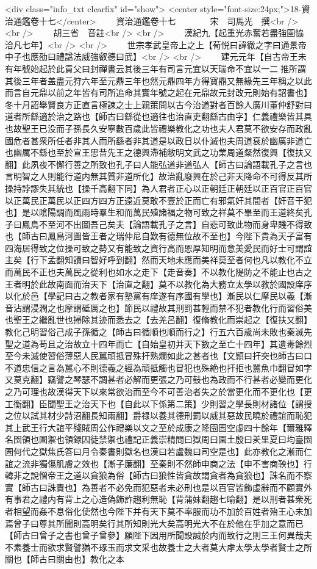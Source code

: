 <div class="info_txt clearfix" id="show">
<center style="font-size:24px;">18-資治通鑑卷十七</center>
  　　資治通鑑卷十七　　　　宋　司馬光　撰<br />
<br />
　　胡三省　音註<br />
<br />
　　漢紀九【起重光赤奮若盡強圉恊洽凡七年】<br />
<br />
　　世宗孝武皇帝上之上【荀悦曰諱徹之字曰通景帝中子也應劭曰禮諡法威強叡德曰武】<br />
<br />
　　建元元年【自古帝王未有年號始起於此貢父曰封禪書云其後三年有司言元宜以天瑞命不宜以一二推所謂其後三年者盖盡元狩六年至元鼎三年也然元鼎四年方得寶鼎又無緣先三年稱之以此而言自元鼎以前之年皆有司所追命其實年號之起在元鼎故元封改元則始有詔書也】冬十月詔舉賢良方正直言極諫之士上親策問以古今治道對者百餘人廣川董仲舒對曰道者所繇適於治之路也【師古曰繇從也適往也治直吏翻繇古由字】仁義禮樂皆其具也故聖王已没而子孫長久安寧數百歲此皆禮樂教化之功也夫人君莫不欲安存而政亂國危者甚衆所任者非其人而所繇者非其道是以政日以仆滅也夫周道衰於幽厲非道亡也幽厲不繇也至於宣王思昔先王之德興滯補敝明文武之功業周道粲然復興【復扶又翻】此夙夜不懈行善之所致也孔子曰人能弘道非道弘人【師古曰論語載孔子之言也言明智之人則能行道内無其質非道所化】故治亂廢興在於己非天降命不可得反其所操持誖謬失其統也【操千高翻下同】為人君者正心以正朝廷正朝廷以正百官正百官以正萬民正萬民以正四方四方正遠近莫敢不壹於正而亡有邪氣奸其間者【奸音干犯也】是以隂陽調而風雨時羣生和而萬民殖諸福之物可致之祥莫不畢至而王道終矣孔子曰鳳鳥不至河不出圖吾己矣夫【論語載孔子之言】自悲可致此物而身卑賤不得致也【師古曰鳳鳥河圖皆王者之瑞仲尼自歎有德無位故不至也】今陛下貴為天子富有四海居得致之位操可致之勢又有能致之資行高而恩厚知明而意美愛民而好士可謂誼主矣【行下孟翻知讀曰智好呼到翻】然而天地未應而美祥莫至者何也凡以教化不立而萬民不正也夫萬民之從利也如水之走下【走音奏】不以教化隄防之不能止也古之王者明於此故南面而治天下【治直之翻】莫不以教化為大務立太學以教於國設庠序以化於邑【學記曰古之教者家有塾黨有庠遂有序國有學也】漸民以仁摩民以義【漸音沾謂浸潤之也摩謂砥厲之也】節民以禮故其刑罰甚輕而禁不犯者教化行而習俗美也聖王之繼亂世也掃除其迹而悉去之【去羌呂翻】復脩教化而崇起之【復扶又翻】教化己明習俗己成子孫循之【師古曰循順也順而行之】行五六百歲尚未敗也秦滅先聖之道為苟且之治故立十四年而亡【自始皇初并天下數之至亡十四年】其遺毒餘烈至今未滅使習俗薄惡人民嚚頑抵冒殊扞熟爛如此之甚者也【文頴曰扞突也師古曰口不道忠信之言為嚚心不則德義之經為頑抵觸也冒犯也殊絶也扞拒也嚚魚巾翻冒如字又莫克翻】竊譬之琴瑟不調甚者必解而更張之乃可鼓也為政而不行甚者必變而更化之乃可理也故漢得天下以來常欲治而至今不可善治者失之於當更化而不更化也【更工衡翻】臣聞聖王之治天下也【自此以下係第二策】少則習之學長則材諸位【謂授之位以試其材少詩沼翻長知兩翻】爵禄以養其德刑罰以威其惡故民曉於禮誼而恥犯其上武王行大誼平殘賊周公作禮樂以文之至於成康之隆囹圄空虚四十餘年【爾雅釋名囹領也圄禦也領録囚徒禁禦也禮記正義崇精問曰獄周曰園土殷曰羑里夏曰均臺囹圄何代之獄焦氏答曰月令秦書則獄名也漢曰若盧魏曰司空是也】此亦教化之漸而仁誼之流非獨傷肌膚之效也【漸子廉翻】至秦則不然師申商之法【申不害商鞅也】行韓非之說憎帝王之道以貪狼為俗【師古曰狼性皆貪故謂貪者為貪狼也】誅名而不察實【師古曰誅責也】為善者不必免而犯惡者未必刑也是以百官皆飾虚辭而不顧實外有事君之禮内有背上之心造偽飾詐趨利無恥【背蒲妹翻趨七喻翻】是以刑者甚衆死者相望而姦不息俗化使然也今陛下并有天下莫不率服而功不加於百姓者殆王心未加焉曾子曰尊其所聞則高明矣行其所知則光大矣高明光大不在於他在乎加之意而已【師古曰曾子之書也曾子曾參】願陛下因用所聞設誠於内而致行之則三王何異哉夫不素養士而欲求賢譬猶不琢玉而求文采也故養士之大者莫大虖太學太學者賢士之所關也【師古曰關由也】教化之本